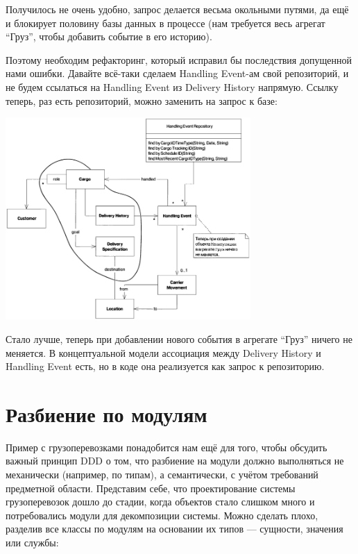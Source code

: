 \documentclass[a5paper]{article}
\begin{document}
Получилось не очень удобно, запрос делается весьма окольными путями, да ещё и блокирует половину базы данных в процессе (нам требуется весь агрегат ``Груз'', чтобы добавить событие в его историю).

Поэтому необходим рефакторинг, который исправил бы последствия допущенной нами ошибки. Давайте всё-таки сделаем Handling Event-ам свой репозиторий, и не будем ссылаться на Handling Event из Delivery History напрямую. Ссылку теперь, раз есть репозиторий, можно заменить на запрос к базе:

\begin{center}
    \includegraphics[width=0.7\textwidth]{cargoRefactored.png}
\end{center}

Стало лучше, теперь при добавлении нового события в агрегате ``Груз'' ничего не меняется. В концептуальной модели ассоциация между Delivery History и Handling Event есть, но в коде она реализуется как запрос к репозиторию.

\section{Разбиение по модулям}

Пример с грузоперевозками понадобится нам ещё для того, чтобы обсудить важный принцип DDD о том, что разбиение на модули должно выполняться не механически (например, по типам), а семантически, с учётом требований предметной области. Представим себе, что проектирование системы грузоперевозок дошло до стадии, когда объектов стало слишком много и потребовались модули для декомпозиции системы. Можно сделать плохо, разделив все классы по модулям на основании их типов --- сущности, значения или службы:
\end{document}

